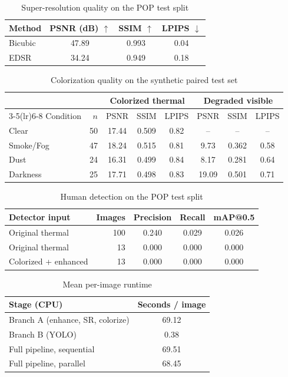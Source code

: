 \begin{table}[t]
\centering
\caption{Super-resolution quality on the POP test split}
\label{tab:sr}
\begin{tabular}{lccc}
\toprule
Method & PSNR (dB) $\uparrow$ & SSIM $\uparrow$ & LPIPS $\downarrow$ \\
\midrule
Bicubic & 47.89 & 0.993 & 0.04 \\
EDSR & 34.24 & 0.949 & 0.18 \\
\bottomrule
\end{tabular}
\end{table}

\begin{table}[t]
\centering
\caption{Colorization quality on the synthetic paired test set}
\label{tab:color}
\small
\begin{tabular}{lrcccccc}
\toprule
 & & \multicolumn{3}{c}{Colorized thermal} & \multicolumn{3}{c}{Degraded visible} \\
\cmidrule(lr){3-5}\cmidrule(lr){6-8}
Condition & $n$ & PSNR & SSIM & LPIPS & PSNR & SSIM & LPIPS \\
\midrule
Clear & 50 & 17.44 & 0.509 & 0.82 & -- & -- & -- \\
Smoke/Fog & 47 & 18.24 & 0.515 & 0.81 & 9.73 & 0.362 & 0.58 \\
Dust & 24 & 16.31 & 0.499 & 0.84 & 8.17 & 0.281 & 0.64 \\
Darkness & 25 & 17.71 & 0.498 & 0.83 & 19.09 & 0.501 & 0.71 \\
\bottomrule
\end{tabular}
\end{table}

\begin{table}[t]
\centering
\caption{Human detection on the POP test split}
\label{tab:det}
\begin{tabular}{lrccc}
\toprule
Detector input & Images & Precision & Recall & mAP@0.5 \\
\midrule
Original thermal & 100 & 0.240 & 0.029 & 0.026 \\
Original thermal & 13 & 0.000 & 0.000 & 0.000 \\
Colorized + enhanced & 13 & 0.000 & 0.000 & 0.000 \\
\bottomrule
\end{tabular}
\end{table}

\begin{table}[t]
\centering
\caption{Mean per-image runtime}
\label{tab:runtime}
\begin{tabular}{lc}
\toprule
Stage (CPU) & Seconds / image \\
\midrule
Branch A (enhance, SR, colorize) & 69.12 \\
Branch B (YOLO) & 0.38 \\
Full pipeline, sequential & 69.51 \\
Full pipeline, parallel & 68.45 \\
\bottomrule
\end{tabular}
\end{table}
